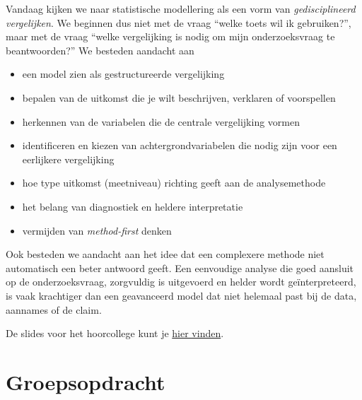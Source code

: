 \documentclass[
  letterpaper,
  DIV=11,
  numbers=noendperiod]{scrreprt}
\providecommand{\tightlist}{%
  \setlength{\itemsep}{0pt}\setlength{\parskip}{0pt}}
\begin{document}
\begin{tcolorbox}[enhanced jigsaw, arc=.35mm, bottomrule=.15mm, bottomtitle=1mm, breakable, colback=white, colbacktitle=quarto-callout-tip-color!10!white, colframe=quarto-callout-tip-color-frame, coltitle=black, left=2mm, leftrule=.75mm, opacityback=0, opacitybacktitle=0.6, rightrule=.15mm, title=\textcolor{quarto-callout-tip-color}{\faLightbulb}\hspace{0.5em}{Hoorcollege 22 juni 2026}, titlerule=0mm, toprule=.15mm, toptitle=1mm]

Vandaag kijken we naar statistische modellering als een vorm van
\emph{gedisciplineerd vergelijken}. We beginnen dus niet met de vraag
``welke toets wil ik gebruiken?'', maar met de vraag ``welke
vergelijking is nodig om mijn onderzoeksvraag te beantwoorden?'' We
besteden aandacht aan

\begin{itemize}
\tightlist
\item
  een model zien als gestructureerde vergelijking
\item
  bepalen van de uitkomst die je wilt beschrijven, verklaren of
  voorspellen
\item
  herkennen van de variabelen die de centrale vergelijking vormen
\item
  identificeren en kiezen van achtergrondvariabelen die nodig zijn voor
  een eerlijkere vergelijking
\item
  hoe type uitkomst (meetniveau) richting geeft aan de analysemethode
\item
  het belang van diagnostiek en heldere interpretatie
\item
  vermijden van \emph{method-first} denken
\end{itemize}

Ook besteden we aandacht aan het idee dat een complexere methode niet
automatisch een beter antwoord geeft. Een eenvoudige analyse die goed
aansluit op de onderzoeksvraag, zorgvuldig is uitgevoerd en helder wordt
geïnterpreteerd, is vaak krachtiger dan een geavanceerd model dat niet
helemaal past bij de data, aannames of de claim.

De slides voor het hoorcollege kunt je \href{slides/lec-5.html}{hier
vinden}.

\end{tcolorbox}

\section{Groepsopdracht}\label{groepsopdracht-4}
\end{document}
